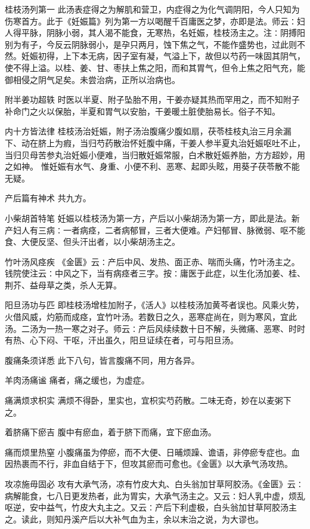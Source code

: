 \documentclass[a4paper,12pt,UTF8,twoside]{ctexbook}
\begin{document}
    桂枝汤列第一
    此汤表症得之为解肌和营卫，内症得之为化气调阴阳，今人只知为伤寒首方。此于《妊娠篇》列为第一方以喝醒千百庸医之梦，亦即是法。师云∶妇人得平脉，阴脉小弱，其人渴不能食，无寒热，名妊娠，桂枝汤主之。注∶阴搏阳别为有子，今反云阴脉弱小，是孕只两月，蚀下焦之气，不能作盛势也，过此则不然。妊娠初得，上下本无病，因子室有凝，气溢上下，故但以芍药一味固其阴气，使不得上溢。以桂、姜、甘、枣扶上焦之阳，而和其胃气，但令上焦之阳气充，能御相侵之阴气足矣。未尝治病，正所以治病也。
    
    附半姜功超轶
    时医以半夏、附子坠胎不用，干姜亦疑其热而罕用之，而不知附子补命门之火以保胎，半夏和胃气以安胎，干姜暖土脏使胎易长。俗子不知。
    
    内十方皆法律
    桂枝汤治妊娠，附子汤治腹痛少腹如扇，茯苓桂枝丸治三月余漏下、动在脐上为瘕，当归芍药散治怀妊腹中痛，干姜人参半夏丸治妊娠呕吐不止，当归贝母苦参丸治妊娠小便难，当归散妊娠常服，白术散妊娠养胎，方方超妙，用之如神。
    惟妊娠有水气、身重、小便不利、恶寒、起即头眩，用葵子茯苓散不能无疑。
    
    产后篇有神术
    共九方。
    
    小柴胡首特笔
    妊娠以桂枝汤为第一方，产后以小柴胡汤为第一方，即此是法。新产妇人有三病∶一者病痉，二者病郁冒，三者大便难。产妇郁冒、脉微弱、呕不能食、大便反坚、但头汗出者，以小柴胡汤主之。
    
    竹叶汤风痉疾
    《金匮》云∶产后中风、发热、面正赤、喘而头痛，竹叶汤主之。钱院使注云∶中风之下，当有病痉者三字。按∶庸医于此症，以生化汤加姜、桂、荆芥、益母草之类，杀人无算。
    
    阳旦汤功与匹
    即桂枝汤增桂加附子，《活人》以桂枝汤加黄芩者误也。风乘火势，火借风威，灼筋而成痉，宜竹叶汤。若数日之久，恶寒症尚在，则为寒风，宜此汤。二汤为一热一寒之对子。师云∶产后风续续数十日不解，头微痛、恶寒、时时有热、心下闷、干呕，汗出虽久，阳旦证续在者，可与阳旦汤。
    
    腹痛条须详悉
    此下八句，皆言腹痛不同，用方各异。
    
    羊肉汤痛谧
    痛者，痛之缓也，为虚症。
    
    痛满烦求枳实
    满烦不得卧，里实也，宜枳实芍药散。二味无奇，妙在以麦粥下之。
    
    着脐痛下瘀吉
    腹中有瘀血，着于脐下而痛，宜下瘀血汤。
    
    痛而烦里热窒
    小腹痛虽为停瘀，而不大便、日晡烦躁、谵语，非停瘀专症也。血因热裹而不行，非血自结于下，但攻其瘀而可愈也。《金匮》以大承气汤攻热。
    
    攻凉施毋固必
    攻有大承气汤，凉有竹皮大丸、白头翁加甘草阿胶汤。《金匮》云∶病解能食，七八日更发热者，此为胃实，大承气汤主之。又云∶妇人乳中虚，烦乱呕逆，安中益气，竹皮大丸主之。又云∶产后下利虚极，白头翁加甘草阿胶汤主之。读此，则知丹溪产后以大补气血为主，余以末治之说，为大谬也。
    
\end{document}
